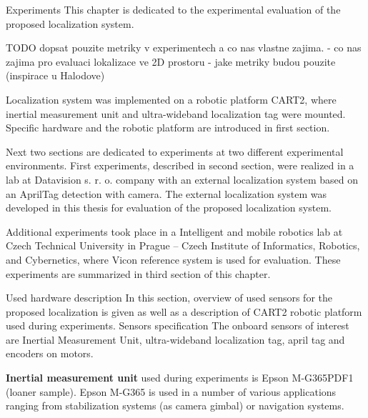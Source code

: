 \chap Experiments
This chapter is dedicated to the experimental evaluation of the proposed localization system.

TODO dopsat pouzite metriky v experimentech a co nas vlastne zajima.
- co nas zajima pro evaluaci lokalizace ve 2D prostoru
- jake metriky budou pouzite
(inspirace u Halodove)


Localization system was implemented on a robotic platform CART2, where inertial measurement unit and ultra-wideband localization tag were mounted. Specific hardware and the robotic platform are introduced in first section.

Next two sections are dedicated to experiments at two different experimental environments. First experiments, described in second section, were realized in a lab at Datavision s. r. o. company with an external localization system based on an AprilTag detection with camera. The external localization system was developed in this thesis for evaluation of the proposed localization system.

Additional experiments took place in a Intelligent and mobile robotics lab at Czech Technical University in Prague – Czech Institute of Informatics, Robotics, and Cybernetics, where Vicon reference system is used for evaluation. These experiments are summarized in third section of this chapter.


\sec Used hardware description
In this section, overview of used sensors for the proposed localization is given as well as a description of CART2 robotic platform used during experiments.
\secc Sensors specification
The onboard sensors of interest are Inertial Measurement Unit, ultra-wideband localization tag, april tag and encoders on motors.

{\bf Inertial measurement unit} used during experiments is Epson M-G365PDF1 (loaner sample). Epson M-G365 is used in a number of various applications ranging from stabilization systems (as camera gimbal) or navigation systems.

\midinsert
{}
\endinsert

